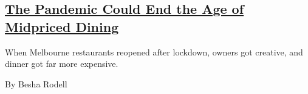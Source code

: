 \begin{enumerate}
\begin{enumerate}
    \hypertarget{the-pandemic-could-end-the-age-of-midpriced-dining}{%
    \subsection{\texorpdfstring{\href{/2020/07/28/dining/melbourne-restaurants-coronavirus.html}{The
    Pandemic Could End the Age of Midpriced
    Dining}}{The Pandemic Could End the Age of Midpriced Dining}}\label{the-pandemic-could-end-the-age-of-midpriced-dining}}

    When Melbourne restaurants reopened after lockdown, owners got
    creative, and dinner got far more expensive.

    By Besha Rodell
  \end{enumerate}
\end{enumerate}

